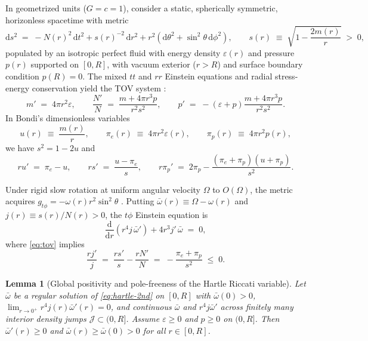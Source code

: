\documentclass[11pt]{article}
\theoremstyle{plain}
\newtheorem{lemma}[theorem]{Lemma}
\theoremstyle{definition}
\newcommand{\dd}{\mathrm{d}}
\newcommand{\eps}{\varepsilon}
\newcommand{\wbar}{\bar{\omega}}
\begin{document}
In geometrized units ($G = c = 1$), consider a static, spherically symmetric, horizonless spacetime with metric
\begin{equation}
  \dd s^2 \;=\; -N(r)^2\,\dd t^2 + s(r)^{-2}\,\dd r^2 + r^2\left(\dd\theta^2 + \sin^2\theta\,\dd\phi^2\right),
  \qquad s(r) \;\equiv\; \sqrt{1 - \frac{2 m(r)}{r}} \;>\; 0,
  \label{eq:metric}
\end{equation}
populated by an isotropic perfect fluid with energy density $\eps(r)$ and pressure $p(r)$ supported on $[0, R]$, with vacuum exterior ($r > R$) and surface boundary condition $p(R) = 0$. The mixed $tt$ and $rr$ Einstein equations and radial stress-energy conservation yield the TOV system \cite{Hartle1967}:
\begin{equation}
  m' \;=\; 4\pi r^2 \eps, \qquad
  \frac{N'}{N} \;=\; \frac{m + 4\pi r^3 p}{r^2 s^2}, \qquad
  p' \;=\; -(\eps + p)\frac{m + 4\pi r^3 p}{r^2 s^2}.
  \label{eq:tov}
\end{equation}
In Bondi's dimensionless variables \cite{Bondi1964}
\begin{equation}
  u(r) \;\equiv\; \frac{m(r)}{r}, \qquad
  \pi_e(r) \;\equiv\; 4\pi r^2 \eps(r), \qquad
  \pi_p(r) \;\equiv\; 4\pi r^2 p(r),
  \label{eq:bondi-vars}
\end{equation}
we have $s^2 = 1 - 2u$ and
\begin{equation}
  r u' \;=\; \pi_e - u, \qquad
  r s' \;=\; \frac{u - \pi_e}{s}, \qquad
  r \pi_p' \;=\; 2 \pi_p - \frac{(\pi_e + \pi_p)(u + \pi_p)}{s^2}.
  \label{eq:tov-bondi}
\end{equation}

Under rigid slow rotation at uniform angular velocity $\Omega$ to $O(\Omega)$, the metric acquires $g_{t\phi} = -\omega(r) r^2 \sin^2\theta$ \cite{Hartle1967}. Putting $\wbar(r) \equiv \Omega - \omega(r)$ and $j(r) \equiv s(r)/N(r) > 0$, the $t\phi$ Einstein equation is
\begin{equation}
  \frac{\dd}{\dd r}\!\left(r^4 j\,\wbar'\right) + 4 r^3 j'\,\wbar \;=\; 0,
  \label{eq:hartle-2nd}
\end{equation}
where \eqref{eq:tov} implies
\begin{equation}
  \frac{r j'}{j} \;=\; \frac{r s'}{s} - \frac{r N'}{N} \;=\; -\frac{\pi_e + \pi_p}{s^2} \;\le\; 0.
  \label{eq:j-deriv}
\end{equation}

\begin{lemma}[Global positivity and pole-freeness of the Hartle Riccati variable]
\label{lem:wbar-pos}
Let $\wbar$ be a regular solution of \eqref{eq:hartle-2nd} on $[0, R]$ with $\wbar(0) > 0$, $\lim_{r\to 0^+} r^4 j(r) \wbar'(r) = 0$, and continuous $\wbar$ and $r^4 j \wbar'$ across finitely many interior density jumps $\mathcal{J} \subset (0, R]$. Assume $\eps \ge 0$ and $p \ge 0$ on $(0, R]$. Then $\wbar'(r) \ge 0$ and $\wbar(r) \ge \wbar(0) > 0$ for all $r \in [0, R]$.
\end{lemma}
\end{document}
